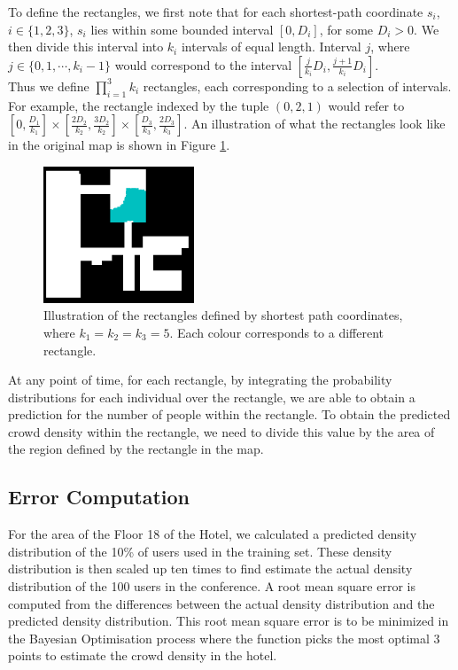 \documentclass[letterpaper]{article}
\begin{document}
To define the rectangles, we first note that for each shortest-path coordinate $s_i$, $i \in \{1,2,3\}$, $s_i$ lies within some bounded interval $[0,D_i]$, for some $D_i > 0$. We then divide this interval into $k_i$ intervals of equal length. Interval $j$, where $j \in \{0,1,\cdots,k_i-1\}$ would correspond to the interval $[\frac{j}{k_i}D_i, \frac{j+1}{k_i}D_i]$.\\

Thus we define $\prod_{i=1}^3 k_i$ rectangles, each corresponding to a selection of intervals. For example, the rectangle indexed by the tuple $(0,2,1)$ would refer to $[0,\frac{D_1}{k_1}]\times [\frac{2D_2}{k_2},\frac{3D_2}{k_2}]\times [\frac{D_3}{k_3},\frac{2D_3}{k_3}]$. An illustration of what the rectangles look like in the original map is shown in Figure \ref{fig:sprectangles}.\\

\begin{figure}[!h]
  \centering
    \includegraphics[width=170px]{diagrams/spsinglerectangle.png}
  \caption{Illustration of the rectangles defined by shortest path coordinates, where $k_1 = k_2 = k_3 = 5$. Each colour corresponds to a different rectangle.}
  \label{fig:sprectangles}
\end{figure}


At any point of time, for each rectangle, by integrating the probability distributions for each individual over the rectangle, we are able to obtain a prediction for the number of people within the rectangle. To obtain the predicted crowd density within the rectangle, we need to divide this value by the area of the region defined by the rectangle in the map.\\



\subsection{Error Computation}

For the area of the Floor 18 of the Hotel, we calculated a predicted density distribution of the 10\% of users used in the training set. These density distribution is then scaled up ten times to find estimate the actual density distribution of the 100 users in the conference. A root mean square error is computed from the differences between the actual density distribution and the predicted density distribution. This root mean square error is to be minimized in the Bayesian Optimisation process where the function picks the most optimal 3 points to estimate the crowd density in the hotel.
\end{document}
